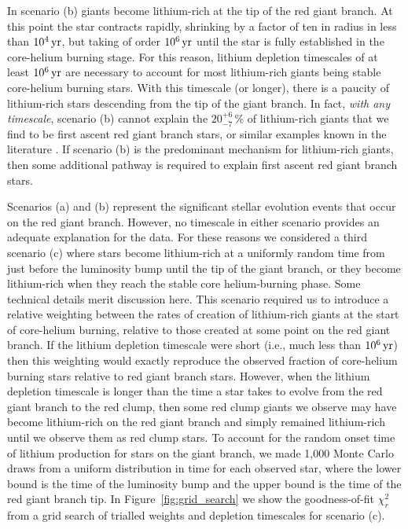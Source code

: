 \documentclass[twocolumn]{aastex62}
\begin{document}
In scenario (b) giants become lithium-rich at the tip of the red giant branch. At this point 
the star contracts rapidly, shrinking by a factor of ten in radius in less than $10^4\,{\rm yr}$,
but taking of order $10^6\,{\rm yr}$ until the star is fully established in the core-helium burning stage. For this reason, lithium depletion timescales of at least $10^6\,{\rm yr}$ are necessary to account for most lithium-rich giants being stable core-helium burning stars. With this timescale (or longer), there is a paucity of lithium-rich stars descending from the tip of the giant branch. In fact, \emph{with any timescale}, scenario (b) cannot explain the $20^{+6}_{-7}$\,\% of lithium-rich giants that we find to be first ascent red giant branch stars, or similar examples known in the literature \citep[e.g.,][]{Kirby_2016}. If scenario (b) is the predominant mechanism for lithium-rich giants, then some additional pathway is required to explain first ascent red giant branch stars.

Scenarios (a) and (b) represent the significant stellar evolution events that occur on the red giant branch. However, no timescale in either scenario provides an adequate explanation for the data. For these reasons we considered a third scenario (c) where stars become lithium-rich at a uniformly random time from just before the luminosity bump until the tip of the giant branch, or they become
lithium-rich when they reach the stable core helium-burning phase. Some technical details merit discussion here. This scenario required us to introduce a relative weighting between the rates of creation of lithium-rich giants at the start of core-helium burning, relative to those created at some point on the red giant branch. If the lithium depletion timescale were short (i.e., much less than $10^6\,{\rm yr}$) then this weighting would exactly reproduce the observed fraction of core-helium burning stars relative to red giant branch stars. However, when the lithium depletion timescale is longer than the time a star takes to evolve from the red giant branch to the red clump, then some red clump giants we observe may have become lithium-rich on the red giant branch and simply remained lithium-rich until we observe them as red clump stars. To account for the random onset time of lithium production  for stars on the giant branch, we made 1,000 Monte Carlo draws from a uniform distribution in time for each observed star, where the lower bound is the time of the luminosity bump and the upper bound is the time of the red giant branch tip. In Figure~\ref{fig:grid_search} we show the goodness-of-fit $\chi_r^2$ from a grid search of trialled weights and depletion timescales for scenario (c). 
\end{document}
